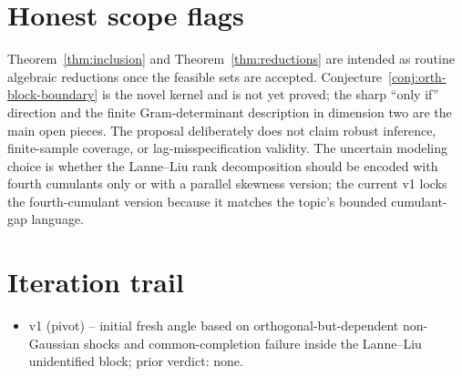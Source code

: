 \documentclass[11pt]{article}
\theoremstyle{definition}
\theoremstyle{plain}
\theoremstyle{remark}
\begin{document}
\section{Honest scope flags}
Theorem~\ref{thm:inclusion} and Theorem~\ref{thm:reductions} are intended as routine algebraic reductions once the feasible sets are accepted.  Conjecture~\ref{conj:orth-block-boundary} is the novel kernel and is not yet proved; the sharp ``only if'' direction and the finite Gram-determinant description in dimension two are the main open pieces.  The proposal deliberately does not claim robust inference, finite-sample coverage, or lag-misspecification validity.  The uncertain modeling choice is whether the Lanne--Liu rank decomposition should be encoded with fourth cumulants only or with a parallel skewness version; the current v1 locks the fourth-cumulant version because it matches the topic's bounded cumulant-gap language.

\section{Iteration trail}
\begin{itemize}[leftmargin=*]
\item v1 (pivot) -- initial fresh angle based on orthogonal-but-dependent non-Gaussian shocks and common-completion failure inside the Lanne--Liu unidentified block; prior verdict: none.
\end{itemize}
\end{document}
